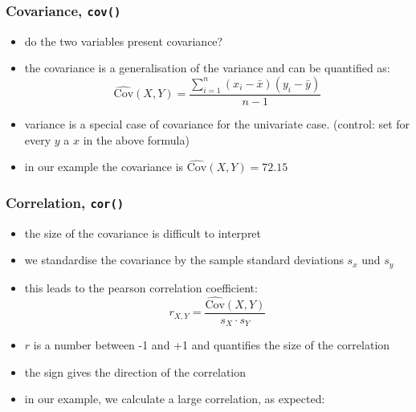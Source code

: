 \documentclass[extsize,handout,10pt]{beamer}\usepackage[]{graphicx}\usepackage[]{color}
\begin{document}
\begin{frame}
  \frametitle{Covariance, \texttt{cov()}}
  \begin{itemize}
  \item<1-> do the two variables present covariance?
  \item<2-> the \alert{covariance} is a generalisation of the variance
    and can be quantified as:\small
    \begin{equation*}
      \widehat{\text{Cov}}(X,Y)=\frac{\sum_{i=1}^n(x_i-\bar{x})(y_i-\bar{y})}{n-1}
      \label{Kovarianz}
    \end{equation*}
\normalsize
  \item<3-> variance is a special case of covariance for the
    univariate case. (control: set for every $y$ a $x$ in the above formula)
  \item<4-> in our example the covariance is
    $\widehat{\text{Cov}}(X,Y)=72.15$
  \end{itemize}
\end{frame}



\begin{frame}
  \frametitle{Correlation, \texttt{cor()}}
  \begin{itemize}
  \item<1-> the size of the covariance is difficult to interpret
  \item<2-> we standardise the covariance by the sample standard deviations
    $s_x$ und $s_y$
  \item this leads to the 
    \alert{pearson correlation coefficient}:
\begin{equation*}
  r_{X,Y}=\frac{\widehat{\text{Cov}}(X,Y)}{s_X\cdot{s_Y}}
\end{equation*}
\item<3-> $r$ is a number between -1 and +1 and quantifies the 
  \alert{size} of the correlation
\item<4-> the sign gives the \alert{direction} of the correlation
\item<5-> in our example, we calculate a large correlation, as
  expected:
\end{itemize}
\end{frame}
\end{document}
